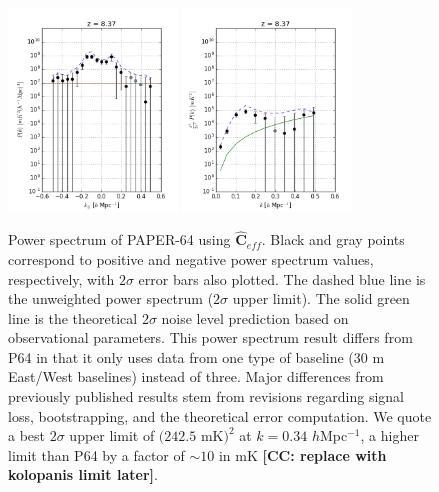 \documentclass[preprint2,numberedappendix,tighten]{aastex6}  %
\newcommand{\cc}[1]{{\color{purple} \textbf{[CC: #1]}}}
\begin{document}
\begin{figure}
	\centering
	\includegraphics[width=0.4\textwidth]{plots/ps1_data_reg.png}
	\includegraphics[width=0.4\textwidth]{plots/ps2_data_reg.png}
	\caption{Power spectrum of PAPER-64 using $\hat{\textbf{C}}_{eff}$. Black and gray points correspond to positive and 
negative power spectrum values, respectively, with $2\sigma$ error bars also plotted. The dashed blue line is the unweighted 
power spectrum ($2\sigma$ upper limit). The solid green line is the theoretical $2\sigma$ noise level prediction based on 
observational parameters. This power spectrum result differs from P64 in that it only uses data from one type of baseline ($30$ m 
East/West baselines) instead of three. Major differences from previously published results stem from revisions regarding signal 
loss, bootstrapping, and the theoretical error computation. We quote a best $2\sigma$ upper limit of $(242.5$ mK$)^{2}$ at 
$k=0.34$ $h$Mpc$^{-1}$, a higher limit than P64 by a factor of $\sim10$ in mK \cc{replace with kolopanis limit later}.}
	\label{fig:ps1_data}
\end{figure}
\end{document}
